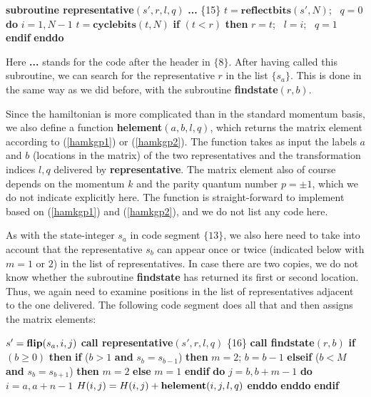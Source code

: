 \documentclass[draft,numberedheadings]{aipproc}
\newcommand{\code}{\null\vskip-2mm\noindent}
\newcommand{\br}{\hfill\break}
\newcommand{\cia}{\null\hskip5mm}
\newcommand{\cib}{\null\hskip10mm}
\newcommand{\cic}{\null\hskip15mm}
\begin{document}
{\code
\cia    {\bf subroutine representative}$(s',r,l,q)$ \br
\cia    {\bf ... }                         \hfill \{15\}\break
\cia    $t=\mathbf{reflectbits}(s',N)$;~ $q=0$\br
\cia    {\bf do} $i=1,N-1$ \br
\cib       $t=\mathbf{cyclebits}(t,N)$ \br 
\cib       {\bf if} $(t<r)$ {\bf then} $r=t$;~ $l=i$;~ $q=1$ {\bf endif} \br
\cia    {\bf enddo} 
\code}

\noindent
Here {\bf ...} stands for the code after the header in $\{8\}$. After having called this subroutine, we can search for the representative $r$ in the list 
$\{s_a\}$. This is done in the same way as we did before, with the subroutine {\bf findstate}$(r,b)$. 

Since the hamiltonian is more complicated than in the standard
momentum basis, we also define a function {\bf helement}$(a,b,l,q)$, which returns the matrix element according to (\ref{hamkgp1}) or 
(\ref{hamkgp2}). The function takes as input the labels $a$ and $b$ (locations in the matrix) of the two representatives and the transformation indices 
$l,q$ delivered by {\bf representative}. The matrix element also of course depends on the momentum $k$ and the parity quantum number $p=\pm 1$, which we do 
not indicate explicitly here. The function is straight-forward to implement based on (\ref{hamkgp1}) and (\ref{hamkgp2}), and we do not list any code here.

As with the state-integer $s_a$ in code segment $\{13\}$, we also here need to take into account that the representative $s_b$ can appear once or twice 
(indicated below with $m=1$ or $2$) in the list of representatives. In case there are two copies, we do not know whether the subroutine {\bf findstate} has 
returned its first or second location. Thus, we again need to examine positions in the list of representatives adjacent to the one delivered. The following 
code segment does all that and then assigns the matrix elements:

{\code
\cia    $s'={\bf flip}(s_a,i,j)$ \br
\cia    {\bf call representative}$(s',r,l,q)$       \hfill \{16\}\break  
\cia    {\bf call findstate}$(r,b)$  \br      
\cia    {\bf if} $(b\ge 0)$ {\bf then} \br
\cib       {\bf if} ($b>1$ {\bf and} $s_b=s_{b-1}$) {\bf then}  \br
\cic          $m=2$; $b=b-1$ \br
\cib       {\bf elseif} ($b<M$ {\bf and} $s_b=s_{b+1}$) {\bf then} \br
\cic          $m=2$ \br
\cib       {\bf else} \br
\cic          $m=1$ \br
\cib       {\bf endif} \br
\cib       {\bf do} $j=b,b+m-1$ \br
\cib       {\bf do} $i=a,a+n-1$ \br
\cic            $H(i,j)=H(i,j)+{\bf helement}(i,j,l,q)$ \br
\cib       {\bf enddo} \br
\cib       {\bf enddo} \br
\cia    {\bf endif} 
\code}
\end{document}
